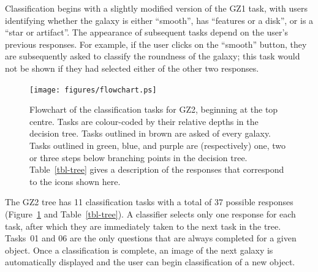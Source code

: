 \documentclass[useAMS,usenatbib]{mn2e}
\begin{document}
Classification begins with a slightly modified version of the GZ1 task, with users identifying whether the galaxy is either ``smooth'', has ``features or a disk'', or is a ``star or artifact''. The appearance of subsequent tasks depend on the user's previous responses. For example, if the user clicks on the ``smooth'' button, they are subsequently asked to classify the roundness of the galaxy; this task would not be shown if they had selected either of the other two responses. 

\begin{figure}
\texttt{[image: figures/flowchart.ps]}
\caption{Flowchart of the classification tasks for GZ2, beginning at the top centre. Tasks are colour-coded by their relative depths in the decision tree. Tasks outlined in brown are asked of every galaxy. Tasks outlined in green, blue, and purple are (respectively) one, two or three steps below branching points in the decision tree. Table~\ref{tbl-tree} gives a description of the responses that correspond to the icons shown here. 
\label{fig-flowchart}}
\end{figure}

The GZ2 tree has 11 classification tasks with a total of 37 possible responses (Figure~\ref{fig-flowchart} and Table~\ref{tbl-tree}). A classifier selects only one response for each task, after which they are immediately taken to the next task in the tree. Tasks~01 and 06 are the only questions that are always completed for a given object. Once a classification is complete, an image of the next galaxy is automatically displayed and the user can begin classification of a new object. 
\end{document}
